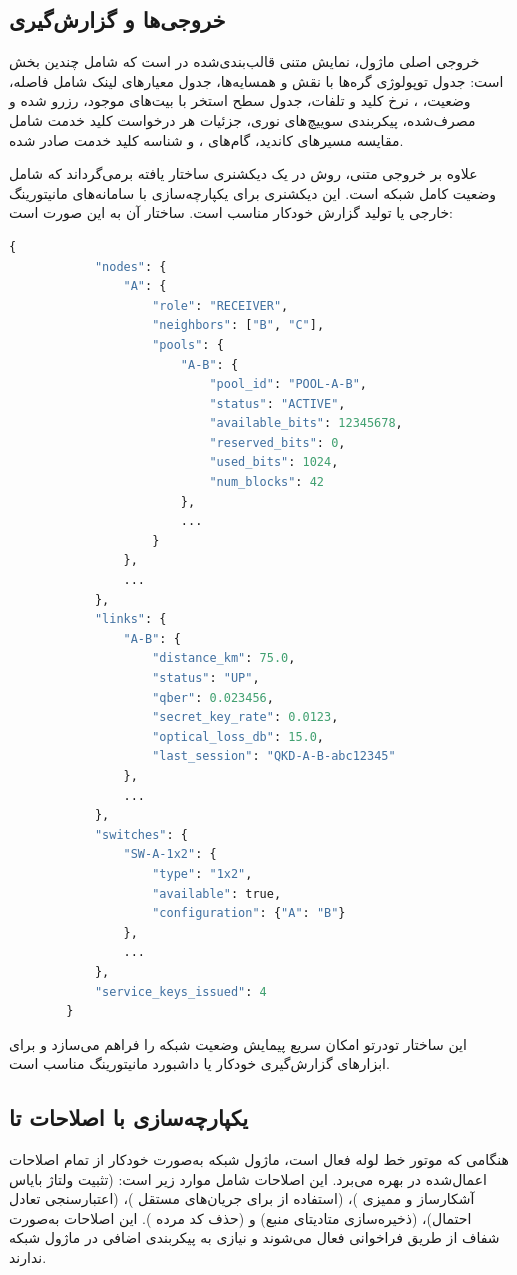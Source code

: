 \subsection{خروجی‌ها و گزارش‌گیری}

خروجی اصلی ماژول، نمایش متنی قالب‌بندی‌شده در  است که شامل چندین بخش است: جدول توپولوژی گره‌ها با نقش و همسایه‌ها، جدول معیارهای لینک شامل فاصله، وضعیت، ، نرخ کلید و تلفات، جدول سطح استخر با بیت‌های موجود، رزرو شده و مصرف‌شده، پیکربندی سوییچ‌های نوری، جزئیات هر درخواست کلید خدمت شامل مقایسه مسیرهای کاندید، گام‌های ، و شناسه کلید خدمت صادر شده.

علاوه بر خروجی متنی، روش  در  یک دیکشنری ساختار یافته برمی‌گرداند که شامل وضعیت کامل شبکه است. این دیکشنری برای یکپارچه‌سازی با سامانه‌های مانیتورینگ خارجی یا تولید گزارش خودکار مناسب است. ساختار آن به این صورت است:

\begin{LTR}
	\begin{lstlisting}[language=Python]
		{
			"nodes": {
				"A": {
					"role": "RECEIVER",
					"neighbors": ["B", "C"],
					"pools": {
						"A-B": {
							"pool_id": "POOL-A-B",
							"status": "ACTIVE",
							"available_bits": 12345678,
							"reserved_bits": 0,
							"used_bits": 1024,
							"num_blocks": 42
						},
						...
					}
				},
				...
			},
			"links": {
				"A-B": {
					"distance_km": 75.0,
					"status": "UP",
					"qber": 0.023456,
					"secret_key_rate": 0.0123,
					"optical_loss_db": 15.0,
					"last_session": "QKD-A-B-abc12345"
				},
				...
			},
			"switches": {
				"SW-A-1x2": {
					"type": "1x2",
					"available": true,
					"configuration": {"A": "B"}
				},
				...
			},
			"service_keys_issued": 4
		}
	\end{lstlisting}
\end{LTR}

این ساختار تودرتو امکان سریع پیمایش وضعیت شبکه را فراهم می‌سازد و برای ابزارهای گزارش‌گیری خودکار یا داشبورد مانیتورینگ مناسب است.

\subsection{یکپارچه‌سازی با اصلاحات  تا }

هنگامی که موتور خط لوله فعال است، ماژول شبکه به‌صورت خودکار از تمام اصلاحات اعمال‌شده در  بهره می‌برد. این اصلاحات شامل موارد زیر است:  (تثبیت ولتاژ بایاس آشکارساز و ممیزی )،  (استفاده از  برای جریان‌های مستقل )،  (اعتبارسنجی تعادل احتمال)،  (ذخیره‌سازی متادیتای منبع) و  (حذف کد مرده ). این اصلاحات به‌صورت شفاف از طریق فراخوانی  فعال می‌شوند و نیازی به پیکربندی اضافی در ماژول شبکه ندارند.

